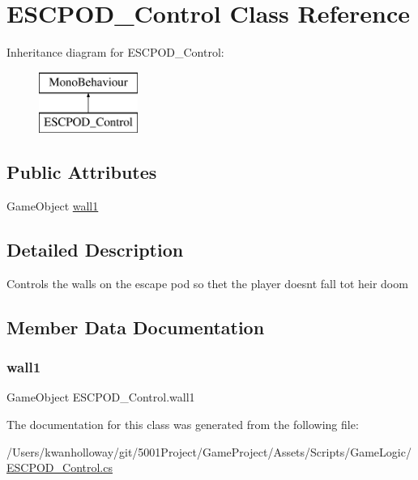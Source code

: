 \hypertarget{class_e_s_c_p_o_d___control}{}\section{E\+S\+C\+P\+O\+D\+\_\+\+Control Class Reference}
\label{class_e_s_c_p_o_d___control}
Inheritance diagram for E\+S\+C\+P\+O\+D\+\_\+\+Control\+:\begin{figure}[H]
\begin{center}
\leavevmode
\includegraphics[height=2.000000cm]{class_e_s_c_p_o_d___control}
\end{center}
\end{figure}
\subsection*{Public Attributes}
\begin{DoxyCompactItemize}
\item 
Game\+Object \hyperlink{class_e_s_c_p_o_d___control_a94e64c0ea528fb7c2691ebd0b018197a}{wall1}
\end{DoxyCompactItemize}


\subsection{Detailed Description}
Controls the walls on the escape pod so thet the player doesn\textquotesingle{}t fall tot heir doom 

\subsection{Member Data Documentation}
\mbox{\label{class_e_s_c_p_o_d___control_a94e64c0ea528fb7c2691ebd0b018197a}} 
\subsubsection{\texorpdfstring{wall1}{wall1}}
{\footnotesize\ttfamily Game\+Object E\+S\+C\+P\+O\+D\+\_\+\+Control.\+wall1}



The documentation for this class was generated from the following file\+:\begin{DoxyCompactItemize}
\item 
/\+Users/kwanholloway/git/5001\+Project/\+Game\+Project/\+Assets/\+Scripts/\+Game\+Logic/\hyperlink{_e_s_c_p_o_d___control_8cs}{E\+S\+C\+P\+O\+D\+\_\+\+Control.\+cs}\end{DoxyCompactItemize}
